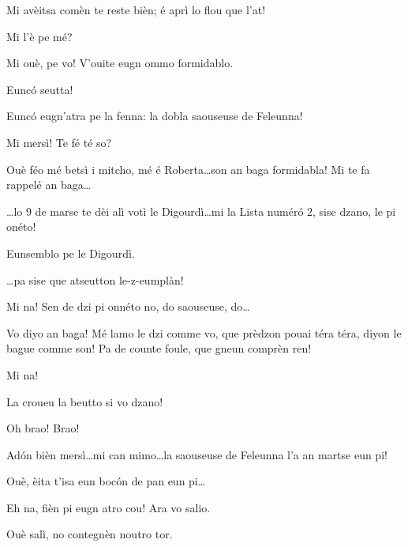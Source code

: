 \begin{drama}
 Mi avèitsa comèn te reste bièn; é aprì lo flou que l'at!

\Jeanspeaks Mi l'è pe mé?

\Cimaspeaks Mi ouè, pe vo! V'ouite eugn ommo formidablo.


\Marcospeaks Eunc\'o seutta!

\Cimaspeaks Eunc\'o eugn'atra pe la fenna: la dobla saouseuse de Feleunna!

\Jeanspeaks Mi mersì! Te fé té so?

\Cimaspeaks Ouè féo mé betsì i mitcho, mé é Roberta\ldots son an baga formidabla! Mi te fa rappelé an baga\ldots


\Cimaspeaks \ldots lo 9 de marse te dèi alì votì le Digourdì\ldots mi la Lista num\'er\'o 2, sise dzano, le pi onéto!


\Jeanspeaks {} \og Eunsemblo pe le Digourdì\fg.

\Marcospeaks \ldots pa sise que atseutton le-z-eumplàn!

\Cimaspeaks Mi na! Sen de dzi pi onnéto no, do saouseuse, do\ldots

\Jeanspeaks  Vo diyo an baga! Mé lamo le dzi comme vo, que prèdzon pouai téra téra, diyon le bague comme son! Pa de counte foule, que gneun comprèn ren!

\Cimaspeaks Mi na! 

\Jeanspeaks La croueu la beutto si vo dzano!

\CimaMarcospeaks Oh brao! Brao!

\Cimaspeaks Ad\'on bièn mersì\ldots mi can mimo\ldots la saouseuse de Feleunna l'a an martse eun pi!

\Jeanspeaks Ouè, èita t'isa eun boc\'on de pan eun pi\ldots

\Cimaspeaks Eh na, fièn pi eugn atro cou! Ara vo salio.

\Marcospeaks Ouè  salì, no contegnèn noutro tor.




\end{drama}
